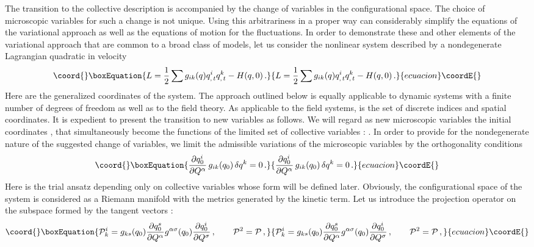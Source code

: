 \documentclass[a4paper,12pt]{article}
\begin{document}
The transition to the collective description is accompanied by the change of
variables in the configurational space. The choice of microscopic variables
for such a change is not unique. Using this arbitrariness in a proper way can
considerably simplify the equations of the variational approach as well as the
equations of motion for the fluctuations. In order to demonstrate these and
other elements of the variational approach that are common to a broad class of
models, let us consider the nonlinear system described by a nondegenerate
Lagrangian quadratic in velocity
\begin{equation*}\coord{}\boxEquation{
L=\frac{1}{2}\sum g_{ik}(q)q_{,\,t}^{i}q_{,\,t}^{k}-H(q,0)\,.
}{
L=\frac{1}{2}\sum g_{ik}(q)q_{,\,t}^{i}q_{,\,t}^{k}-H(q,0)\,.
}{ecuacion}\coordE{}\end{equation*}
Here \coordHE{} are the generalized coordinates of the system. The
approach outlined below is equally applicable to dynamic systems
with a finite number of degrees of freedom as well as to the field
theory. As applicable to the field systems, \coordHE{} is
the set of discrete indices and spatial coordinates. It is
expedient to present the transition to new variables as follows.
We will regard as new microscopic variables the initial
coordinates \coordHE{}, that simultaneously become the functions of the
limited set of collective variables \coordHE{}:
\coordHE{} . In order to provide for the nondegenerate
nature of the suggested change of variables, we limit the
admissible variations of the microscopic variables \coordHE{} by the orthogonality conditions
\begin{equation}\coord{}\boxEquation{
\frac{\partial q_{0}^{i}}{\partial Q^{\alpha }}\,g_{ik}(q_{0})\,\delta
q^{k}=0\,. \label{c}
}{
\frac{\partial q_{0}^{i}}{\partial Q^{\alpha }}\,g_{ik}(q_{0})\,\delta
q^{k}=0\,. }{ecuacion}\coordE{}\end{equation}
Here \coordHE{} is the trial ansatz depending
only on collective variables whose form will be defined later.
Obviously, the configurational space of the system is considered
as a Riemann manifold with the metrics \coordHE{} generated by
the kinetic term. Let us introduce the projection operator on the
subspace formed by the tangent vectors \coordHE{}:
\begin{equation}\coord{}\boxEquation{
\mathcal{P}_{k}^{i}=g_{ks}(q_{0})\frac{\partial
q_{0}^{s}}{\partial Q^{\alpha }}g^{\alpha \sigma
}(q_{0})\frac{\partial q_{0}^{i}}{\partial Q^{\sigma }}\,,\qquad
\mathcal{P}^{2}=\mathcal{P}\,,  \label{n}
}{
\mathcal{P}_{k}^{i}=g_{ks}(q_{0})\frac{\partial
q_{0}^{s}}{\partial Q^{\alpha }}g^{\alpha \sigma
}(q_{0})\frac{\partial q_{0}^{i}}{\partial Q^{\sigma }}\,,\qquad
\mathcal{P}^{2}=\mathcal{P}\,,  }{ecuacion}\coordE{}\end{equation}
\end{document}
